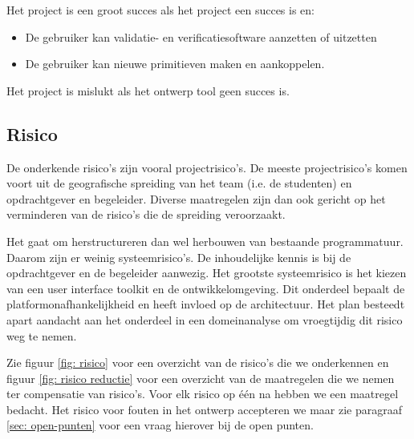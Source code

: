 Het project is een groot succes als het project een succes is en:

\begin{itemize}
 \item De gebruiker kan validatie- en verificatiesoftware aanzetten of uitzetten
 \item De gebruiker kan nieuwe primitieven maken en aankoppelen.
\end{itemize}

Het project is mislukt als het ontwerp tool geen succes is.

\subsection{Risico}

De onderkende risico's zijn vooral projectrisico's. De meeste projectrisico's komen voort uit de
geografische spreiding van het team (i.e. de studenten) en opdrachtgever
en begeleider. Diverse maatregelen zijn dan ook gericht op het verminderen
van de risico's die de spreiding veroorzaakt.

Het gaat om herstructureren dan wel herbouwen van bestaande programmatuur. Daarom zijn er weinig systeemrisico's.
De inhoudelijke kennis is bij de opdrachtgever en de begeleider aanwezig. Het grootste systeemrisico is het kiezen
van een user interface toolkit en de ontwikkelomgeving. Dit onderdeel bepaalt de platformonafhankelijkheid
en heeft invloed op de architectuur. Het plan besteedt apart aandacht aan het onderdeel in een domeinanalyse om
vroegtijdig dit risico weg te nemen.

Zie figuur \ref{fig: risico} voor een overzicht van de risico's die we onderkennen en figuur \ref{fig: risico reductie} voor
een overzicht van de maatregelen die we nemen ter compensatie van risico's. Voor elk risico op \'e\'en na hebben we een
maatregel bedacht. Het risico voor fouten in het ontwerp accepteren we maar zie paragraaf \ref{sec: open-punten} voor
een vraag hierover bij de open punten.

